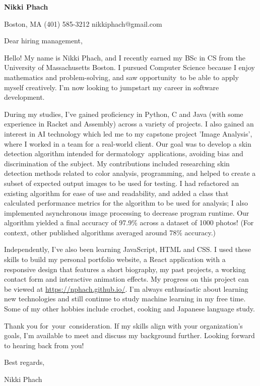 \documentclass[letterpaper]{article}
\newcommand{\infotab}{\quad\textbar\quad}
\newcommand{\dfill}{\xdotfill[0.5ex]{.4pt}}
\let\oldfaIcon\faIcon
\renewcommand{\faIcon}[1]{{\color{accent}\oldfaIcon{#1}}}
\begin{document}
    \begin{center}
        {\huge \textbf{Nikki Phach}}
        \vspace{5mm}

        \mbox{} \dfill\enspace
             Boston, MA \infotab
             (401) 585-3212 \infotab
             nikkiphach@gmail.com
        \enspace \dfill
    \end{center}

    \vspace{5mm}

    \noindent
    Dear hiring management,
    \vspace{5mm}

    Hello! My name is Nikki Phach, and I recently earned my BSc in CS from the University of Massachusetts Boston. I pursued Computer Science because I enjoy mathematics and problem-solving, and saw opportunity to be able to apply myself creatively. I'm now looking to jumpstart my career in software development.
    
    During my studies, I've gained proficiency in Python, C and Java (with some experience in Racket and Assembly) across a variety of projects. I also gained an interest in AI technology which led me to my capstone project 'Image Analysis', where I worked in a team for a real-world client. Our goal was to develop a skin detection algorithm intended for dermatology applications, avoiding bias and discrimination of the subject. My contributions included researching skin detection methods related to color analysis, programming, and helped to create a subset of expected output images to be used for testing. I had refactored an existing algorithm for ease of use and readability, and added a class that calculated performance metrics for the algorithm to be used for analysis; I also implemented asynchronous image processing to decrease program runtime. Our algorithm yielded a final accuracy of 97.9\% across a dataset of 1000 photos! (For context, other published algorithms averaged around 78\% accuracy.)

    Independently, I've also been learning JavaScript, HTML and CSS. I used these skills to build my personal portfolio website, a React application with a responsive design that features a short biography, my past projects, a working contact form and interactive animation effects. My progress on this project can be viewed at \href{https://nphach.github.io/}{https://nphach.github.io/}. I'm always enthusiastic about learning new technologies and still continue to study machine learning in my free time. Some of my other hobbies include crochet, cooking and Japanese language study.

    Thank you for your consideration. If my skills align with your organization's goals, I'm available to meet and discuss my background further. Looking forward to hearing back from you!
    

    \vspace{5mm}
    Best regards,

    Nikki Phach
\end{document}
